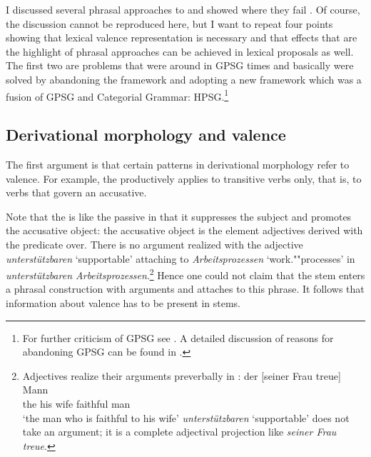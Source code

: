 \documentclass[output=paper,biblatex,babelshorthands,newtxmath,draftmode,colorlinks,citecolor=brown]{langscibook}
\begin{document}
\begin{sloppypar}
I discussed several phrasal approaches to  and showed where they fail
\citep{Mueller2006d,Mueller2006c,Mueller2007d,MuellerPersian,MWArgSt,MWArgStReply,MuellerLFGphrasal}. Of course,
the discussion cannot be reproduced here, but I want to repeat four points showing that lexical valence
representation is necessary and that effects that are the highlight of phrasal approaches can be
achieved in lexical proposals as well. The first two are problems that were around in GPSG times and basically
were solved by abandoning the framework and adopting a new framework which was a fusion of GPSG and
Categorial Grammar: HPSG.\footnote{
  For further criticism of GPSG see . A detailed discussion of reasons for
  abandoning GPSG can be found in .
}
\end{sloppypar}

\subsection{Derivational morphology and valence}

The first argument \citep[Section~5.5.1]{MuellerGT-Eng1} is that certain patterns in derivational morphology refer to valence. For
example, the \bard productively applies to transitive verbs only, that is, to verbs that govern an accusative.
\eal
{}
\zl
\begin{sloppypar}
\noindent
Note that the \bard is like the passive in that it suppresses the subject and promotes the accusative object: the
accusative object is the element adjectives derived with the \bard predicate over. There is no argument
realized with the adjective \emph{unterstützbaren} `supportable' attaching to \emph{Arbeitsprozessen} `work.""processes' in \emph{unterstützbaren
  Arbeitsprozessen}.\footnote{
Adjectives realize their arguments preverbally in :
\ea
\gll der [seiner Frau treue] Mann\\
     the \spacebr{}his wife faithful man\\
\glt `the man who is faithful to his wife'
\z
\emph{unterstützbaren} `supportable' does not take an argument; it is a complete adjectival projection like \emph{seiner Frau treue}.
}  Hence one could not claim that the stem enters a phrasal construction with arguments and
 attaches to this phrase. It follows that information about valence has to be present in
stems.
\end{sloppypar}
\end{document}
